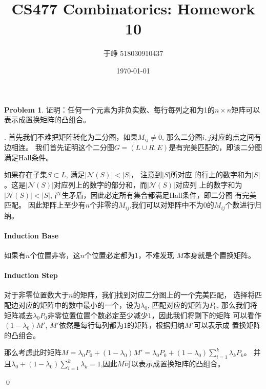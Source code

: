 \documentclass[UTF8]{ctexart}
\newenvironment{sol}
  {\par\vspace{3mm}\noindent{\it Solution}.}
  {\qed \\ \medskip}
\theoremstyle{definition}
\newtheorem{problem}{Problem}
\begin{document}
\title{CS477 Combinatorics: Homework 10}
\author{于峥 518030910437}
\date{\today}

\maketitle

\begin{problem}
证明：任何一个元素为非负实数、每行每列之和为1的$n \times n$矩阵可以表示成置换矩阵的凸组合。
\begin{sol}
  首先我们不难把矩阵转化为二分图，如果$M_{ij}\not=0$, 那么二分图$i,j$对应的点之间有边相连。
  我们首先证明这个二分图$G=(L\cup R, E)$是有完美匹配的，即该二分图满足Hall条件。

  如果存在子集$S\subset L$, 满足$|\mathcal{N}(S)|<|S|$， 注意到$|S|$所对应
的行上的数字和为$|S|$。这是$|\mathcal{N}(S)|$对应列上的数字的部分和，而$|\mathcal{N}(S)|$对应列
上的数字和为$|\mathcal{N}(S)| < |S|$, 产生矛盾，因此必定所有集合都满足Hall条件，即二分图
有完美匹配。
因此矩阵上至少有$n$个非零的$M_{ij}$,我们可以对矩阵中不为0的$M_{ij}$个数进行归纳。

\paragraph{Induction Base} 如果有$n$个位置非零，这$n$个位置必定都为1，不难发现
$M$本身就是个置换矩阵。

\paragraph{Induction Step} 对于非零位置数大于$n$的矩阵，我们找到对应二分图上的一个完美匹配，
选择将匹配边对应的矩阵中的数中最小的一个，设为$\lambda_0$, 匹配对应的矩阵为$P_0$, 
那么我们将矩阵减去$\lambda_0P_0$非零位置位置个数必定至少减少$1$，因此我们将剩下的矩阵
可以看作$(1-\lambda_0)M'$, $M'$依然是每行每列都为1的矩阵，根据归纳$M'$可以表示成
置换矩阵的凸组合。

那么考虑此时矩阵$M=\lambda_0P_0+(1-\lambda_0)M'=\lambda_0P_0+(1-\lambda_0)\sum_{i=1}^k\lambda_kP_k$。
并且$\lambda_0+(1-\lambda_0)\sum_{i=1}^k\lambda_k=1$,因此$M$可以表示成置换矩阵的凸组合。


\end{sol}
\end{problem}
\end{document}
